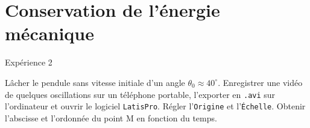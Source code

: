 \documentclass[a4paper,french,bookmarks]{article}
\begin{document}
\section{Conservation de l'énergie mécanique}

\begin{form}{Expérience 2}{}
    \begin{center}
    \end{center}
    \begin{enumerate}
        \ithand Lâcher le pendule sans vitesse initiale d’un angle $\theta_0 \approx 40^\circ$.
        \ithand Enregistrer une vidéo de quelques oscillations sur un téléphone portable, l’exporter en \verb|.avi| sur l’ordinateur et ouvrir le logiciel \verb|LatisPro|.
        \ithand Régler l’\verb|Origine| et l’\verb|Échelle|. Obtenir l’abscisse et l’ordonnée du point M en fonction du temps.
    \end{enumerate}
\end{form}
\end{document}
